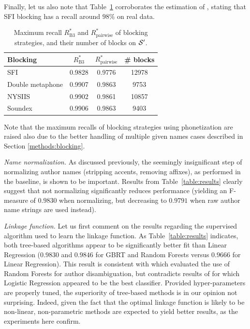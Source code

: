 \documentclass{article}
\begin{document}
Finally, let us also note that Table~\ref{table:blocking} corroborates the
estimation of \citep{torvik2009author}, stating that SFI blocking has a recall
around $98\%$ on real data.

\begin{table}
\caption{Maximum recall $R_\text{B3}^*$ and $R_\text{pairwise}^*$ of blocking strategies, and their number of blocks on ${\cal S}^\prime$.}
\label{table:blocking}
\centering
\begin{tabular}{|l|cc|c|}
  \hline
  \textbf{Blocking} & $R_\text{B3}^*$ & $R_\text{pairwise}^*$ & \# blocks \\
  \hline
  \hline
    SFI & 0.9828 & 0.9776 & 12978 \\
    Double metaphone & 0.9907 & 0.9863 & 9753 \\
    NYSIIS & 0.9902 & 0.9861 & 10857 \\
    Soundex & 0.9906 & 0.9863 & 9403 \\
  \hline
\end{tabular}
\end{table}

Note that the maximum recalls of blocking strategies using phonetization are
raised also due to the better handling of multiple given names cases described in Section \ref{methods:blocking}.

\textit{Name normalization.} As discussed previously, the seemingly insignificant step of
normalizing author names (stripping accents, removing affixes), as performed in the
baseline, is shown to be important. Results from Table~\ref{table:results} clearly suggest that not
normalizing significantly reduces performance (yielding an F-measure of $0.9830$ when normalizing,
but decreasing to $0.9791$ when raw author name strings are used instead).

\textit{Linkage function.} Let us first comment on the results regarding the
supervised algorithm used to learn the linkage function.
As Table~\ref{table:results} indicates, both tree-based algorithms appear to be
significantly better fit than Linear Regression ($0.9830$ and $0.9846$ for GBRT
and Random Forests versus $0.9666$ for Linear Regression). This result is
consistent with \citep{treeratpituk2009disambiguating} which evaluated the use of
Random Forests for author disambiguation, but contradicts results of
\citep{levin2012citation} for which Logistic Regression appeared to be the best
classifier.
Provided hyper-parameters are properly tuned, the superiority of
tree-based methods is in our opinion not surprising.
Indeed, given the fact that the optimal linkage function is likely to be non-linear, non-parametric
methods are expected to yield better results, as the experiments here confirm.
\end{document}
